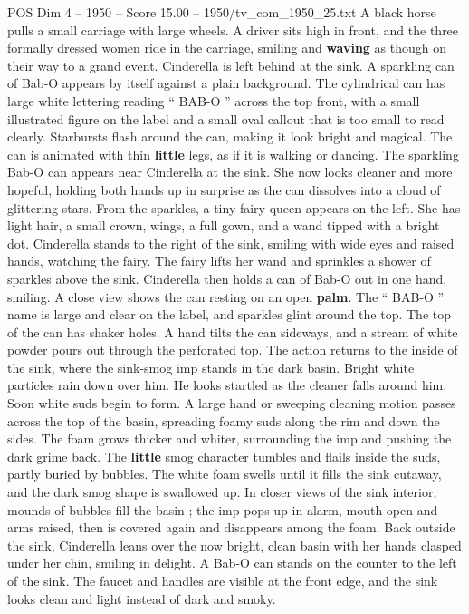 \begin{textsample}{POS Dim 4 – 1950 – Score 15.00 – 1950/tv\_com\_1950\_25.txt}
A black horse pulls a small carriage with large wheels.
A driver sits high in front, and the three formally dressed women ride in the carriage, smiling and \textbf{waving} as though on their way to a grand event.
Cinderella is left behind at the sink.
A sparkling can of Bab-O appears by itself against a plain background.
The cylindrical can has large white lettering reading “ BAB-O ” across the top front, with a small illustrated figure on the label and a small oval callout that is too small to read clearly.
Starbursts flash around the can, making it look bright and magical.
The can is animated with thin \textbf{little} legs, as if it is walking or dancing.
The sparkling Bab-O can appears near Cinderella at the sink.
She now looks cleaner and more hopeful, holding both hands up in surprise as the can dissolves into a cloud of glittering stars.
From the sparkles, a tiny fairy queen appears on the left.
She has light hair, a small crown, wings, a full gown, and a wand tipped with a bright dot.
Cinderella stands to the right of the sink, smiling with wide eyes and raised hands, watching the fairy.
The fairy lifts her wand and sprinkles a shower of sparkles above the sink.
Cinderella then holds a can of Bab-O out in one hand, smiling.
A close view shows the can resting on an open \textbf{palm}.
The “ BAB-O ” name is large and clear on the label, and sparkles glint around the top.
The top of the can has shaker holes.
A hand tilts the can sideways, and a stream of white powder pours out through the perforated top.
The action returns to the inside of the sink, where the sink-smog imp stands in the dark basin.
Bright white particles rain down over him.
He looks startled as the cleaner falls around him.
Soon white suds begin to form.
A large hand or sweeping cleaning motion passes across the top of the basin, spreading foamy suds along the rim and down the sides.
The foam grows thicker and whiter, surrounding the imp and pushing the dark grime back.
The \textbf{little} smog character tumbles and flails inside the suds, partly buried by bubbles.
The white foam swells until it fills the sink cutaway, and the dark smog shape is swallowed up.
In closer views of the sink interior, mounds of bubbles fill the basin ; the imp pops up in alarm, mouth open and arms raised, then is covered again and disappears among the foam.
Back outside the sink, Cinderella leans over the now bright, clean basin with her hands clasped under her chin, smiling in delight.
A Bab-O can stands on the counter to the left of the sink.
The faucet and handles are visible at the front edge, and the sink looks clean and light instead of dark and smoky.

\end{textsample}
